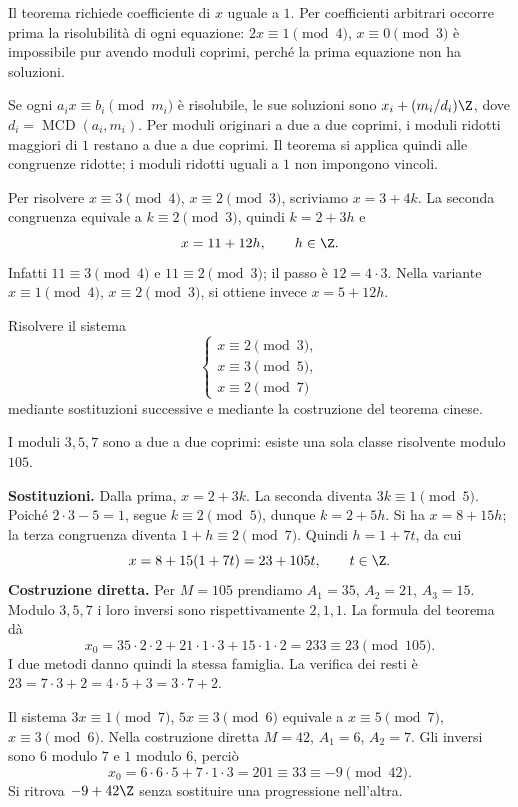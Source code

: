 \begin{osservazione}
Il teorema richiede coefficiente di $x$ uguale a $1$. Per coefficienti arbitrari occorre prima la risolubilità di ogni equazione: $2x\equiv1\pmod4$, $x\equiv0\pmod3$ è impossibile pur avendo moduli coprimi, perché la prima equazione non ha soluzioni.

Se ogni $a_ix\equiv b_i\pmod{m_i}$ è risolubile, le sue soluzioni sono $x_i+(m_i/d_i)\Z$, dove $d_i=\operatorname{MCD}(a_i,m_i)$. Per moduli originari a due a due coprimi, i moduli ridotti maggiori di $1$ restano a due a due coprimi. Il teorema si applica quindi alle congruenze ridotte; i moduli ridotti uguali a $1$ non impongono vincoli.
\end{osservazione}

\begin{esempio}
Per risolvere $x\equiv3\pmod4$, $x\equiv2\pmod3$, scriviamo $x=3+4k$. La seconda congruenza equivale a $k\equiv2\pmod3$, quindi $k=2+3h$ e
\[
x=11+12h,\qquad h\in\Z.
\]
Infatti $11\equiv3\pmod4$ e $11\equiv2\pmod3$; il passo è $12=4\cdot3$. Nella variante $x\equiv1\pmod4$, $x\equiv2\pmod3$, si ottiene invece $x=5+12h$.
\end{esempio}

\begin{esercizio}
Risolvere il sistema
\[
\begin{cases}
x\equiv2\pmod3,\\
x\equiv3\pmod5,\\
x\equiv2\pmod7
\end{cases}
\]
mediante sostituzioni successive e mediante la costruzione del teorema cinese.
\end{esercizio}
\begin{svolgimento}
I moduli $3,5,7$ sono a due a due coprimi: esiste una sola classe risolvente modulo $105$.

\textbf{Sostituzioni.} Dalla prima, $x=2+3k$. La seconda diventa $3k\equiv1\pmod5$. Poiché $2\cdot3-5=1$, segue $k\equiv2\pmod5$, dunque $k=2+5h$. Si ha $x=8+15h$; la terza congruenza diventa $1+h\equiv2\pmod7$. Quindi $h=1+7t$, da cui
\[
x=8+15(1+7t)=23+105t,\qquad t\in\Z.
\]
\textbf{Costruzione diretta.} Per $M=105$ prendiamo $A_1=35$, $A_2=21$, $A_3=15$. Modulo $3,5,7$ i loro inversi sono rispettivamente $2,1,1$. La formula del teorema dà
\[
x_0=35\cdot2\cdot2+21\cdot1\cdot3+15\cdot1\cdot2=233\equiv23\pmod{105}.
\]
I due metodi danno quindi la stessa famiglia. La verifica dei resti è $23=7\cdot3+2=4\cdot5+3=3\cdot7+2$.
\end{svolgimento}

\begin{esempio}
Il sistema $3x\equiv1\pmod7$, $5x\equiv3\pmod6$ equivale a $x\equiv5\pmod7$, $x\equiv3\pmod6$. Nella costruzione diretta $M=42$, $A_1=6$, $A_2=7$. Gli inversi sono $6$ modulo $7$ e $1$ modulo $6$, perciò
\[
x_0=6\cdot6\cdot5+7\cdot1\cdot3=201\equiv33\equiv-9\pmod{42}.
\]
Si ritrova $-9+42\Z$ senza sostituire una progressione nell'altra.
\end{esempio}
